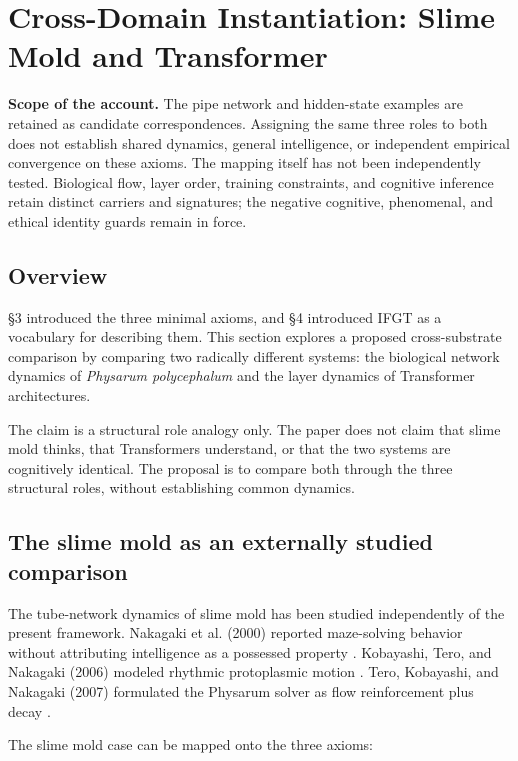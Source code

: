 \section{Cross-Domain Instantiation: Slime Mold and Transformer}

\noindent\textbf{Scope of the account.} The pipe network and hidden-state examples are retained as candidate correspondences. Assigning the same three roles to both does not establish shared dynamics, general intelligence, or independent empirical convergence on these axioms. The mapping itself has not been independently tested. Biological flow, layer order, training constraints, and cognitive inference retain distinct carriers and signatures; the negative cognitive, phenomenal, and ethical identity guards remain in force.


\subsection{Overview}

\S{}3 introduced the three minimal axioms, and \S{}4 introduced IFGT as a vocabulary for describing them. This section explores a proposed cross-substrate comparison by comparing two radically different systems: the biological network dynamics of \emph{Physarum polycephalum} and the layer dynamics of Transformer architectures.

The claim is a structural role analogy only. The paper does not claim that slime mold thinks, that Transformers understand, or that the two systems are cognitively identical. The proposal is to compare both through the three structural roles, without establishing common dynamics.

\subsection{The slime mold as an externally studied comparison}

The tube-network dynamics of slime mold has been studied independently of the present framework. Nakagaki et al. (2000) reported maze-solving behavior without attributing intelligence as a possessed property \citep{Nakagaki2000}. Kobayashi, Tero, and Nakagaki (2006) modeled rhythmic protoplasmic motion \citep{Kobayashi2006}. Tero, Kobayashi, and Nakagaki (2007) formulated the Physarum solver as flow reinforcement plus decay \citep{Tero2007}.

The slime mold case can be mapped onto the three axioms:

